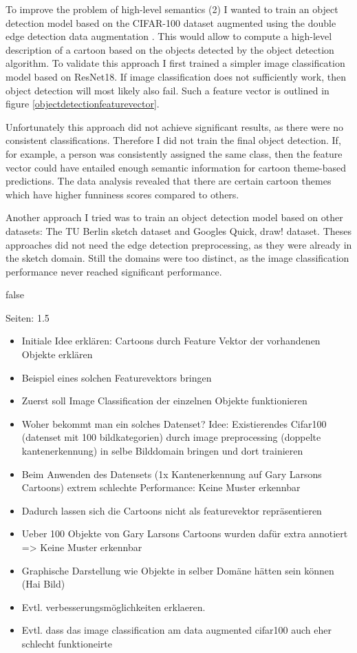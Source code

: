 \documentclass[draft,final,oneside]{vutinfth} %
\begin{document}
To improve the problem of high-level semantics (2) I wanted to train an object detection model based on the CIFAR-100 dataset augmented using the double edge detection data augmentation \cite{cifar100}. This would allow to compute a high-level description of a cartoon based on the objects detected by the object detection algorithm. To validate this approach I first trained a simpler image classification model based on ResNet18. If image classification does not sufficiently work, then object detection will most likely also fail. Such a feature vector is outlined in figure \ref{objectdetectionfeaturevector}.

Unfortunately this approach did not achieve significant results, as there were no consistent classifications. Therefore I did not train the final object detection. If, for example, a person was consistently assigned the same class, then the feature vector could have entailed enough semantic information for cartoon theme-based predictions. The data analysis revealed that there are certain cartoon themes which have higher funniness scores compared to others. 

Another approach I tried was to train an object detection model based on other datasets: The TU Berlin sketch dataset and Googles Quick, draw! dataset.\cite{tuberlin}\cite{quickdraw} Theses approaches did not need the edge detection preprocessing, as they were already in the sketch domain. Still the domains were too distinct, as the image classification performance never reached significant performance.

\if false

Seiten: 1.5

\begin{itemize}
\item Initiale Idee erklären: Cartoons durch Feature Vektor der vorhandenen Objekte erklären
\item Beispiel eines solchen Featurevektors bringen
\item Zuerst soll Image Classification der einzelnen Objekte funktionieren
\item Woher bekommt man ein solches Datenset? Idee: Existierendes Cifar100 (datenset mit 100 bildkategorien) durch image preprocessing (doppelte kantenerkennung) in selbe Bilddomain bringen und dort trainieren
\item Beim Anwenden des Datensets (1x Kantenerkennung auf Gary Larsons Cartoons) extrem schlechte Performance: Keine Muster erkennbar
\item Dadurch lassen sich die Cartoons nicht als featurevektor repräsentieren
\item Ueber 100 Objekte von Gary Larsons Cartoons wurden dafür extra annotiert => Keine Muster erkennbar
\item Graphische Darstellung wie Objekte in selber Domäne hätten sein können (Hai Bild)
\item Evtl. verbesserungsmöglichkeiten erklaeren.
\item Evtl. dass das image classification am data augmented cifar100 auch eher schlecht funktioneirte
\end{itemize}
\end{document}
